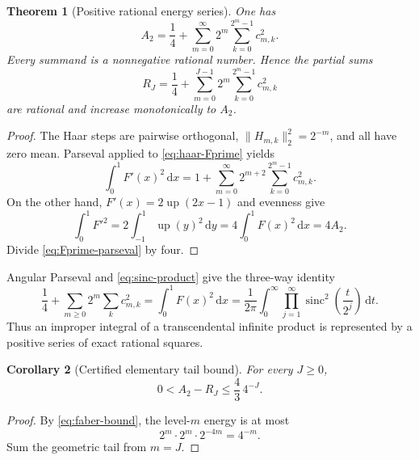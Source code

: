\documentclass[11pt,oneside]{article}
\newtheorem{theorem}{Theorem}[section]
\newtheorem{corollary}[theorem]{Corollary}
\theoremstyle{definition}
\theoremstyle{remark}
\newcommand{\Up}{\operatorname{up}}
\newcommand{\sinc}{\operatorname{sinc}}
\newcommand{\dd}{\,\mathrm d}
\newcommand{\1}{\mathbf 1}
\begin{document}
\begin{theorem}[Positive rational energy series]
\label{thm:A2-rational-series}
One has
\begin{equation}
 \boxed{\displaystyle
 A_2=\frac14+
 \sum_{m=0}^\infty2^m\sum_{k=0}^{2^m-1}c_{m,k}^2.}       \label{eq:A2-rational-series}
\end{equation}
Every summand is a nonnegative rational number.  Hence the partial sums
\begin{equation}
 R_J=\frac14+
 \sum_{m=0}^{J-1}2^m\sum_{k=0}^{2^m-1}c_{m,k}^2          \label{eq:Rj-definition}
\end{equation}
are rational and increase monotonically to $A_2$.
\end{theorem}

\begin{proof}
The Haar steps are pairwise orthogonal,
$\|H_{m,k}\|_2^2=2^{-m}$, and all have zero mean.  Parseval applied to
\eqref{eq:haar-Fprime} yields
\begin{equation}
 \int_0^1F'(x)^2\dd x
 =1+\sum_{m=0}^\infty2^{m+2}\sum_{k=0}^{2^m-1}c_{m,k}^2. \label{eq:Fprime-parseval}
\end{equation}
On the other hand, $F'(x)=2\Up(2x-1)$ and evenness give
\[
 \int_0^1F'^2
 =2\int_{-1}^{1}\Up(y)^2\dd y
 =4\int_0^1F(x)^2\dd x=4A_2.
\]
Divide \eqref{eq:Fprime-parseval} by four.
\end{proof}

Angular Parseval and \eqref{eq:sinc-product} give the three-way identity
\begin{equation}
 \boxed{\displaystyle
 \frac14+\sum_{m\ge0}2^m\sum_kc_{m,k}^2
 =\int_0^1F(x)^2\dd x
 =\frac1{2\pi}\int_0^\infty
   \prod_{j=1}^\infty\sinc^2\!\left(\frac{t}{2^j}\right)\dd t.} \label{eq:A2-three-way}
\end{equation}
Thus an improper integral of a transcendental infinite product is represented
by a positive series of exact rational squares.

\begin{corollary}[Certified elementary tail bound]
\label{cor:A2-tail-bound}
For every $J\ge0$,
\begin{equation}
 0<A_2-R_J\le\frac43\,4^{-J}.                            \label{eq:A2-tail-bound}
\end{equation}
\end{corollary}

\begin{proof}
By \eqref{eq:faber-bound}, the level-$m$ energy is at most
\[
 2^m\cdot2^m\cdot2^{-4m}=4^{-m}.
\]
Sum the geometric tail from $m=J$.
\end{proof}
\end{document}

